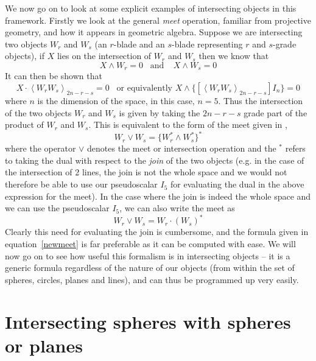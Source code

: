 We now go on to look at some explicit examples of
intersecting objects in this framework. Firstly we look
at the general \emph{meet} operation, familiar from
projective geometry, and how it appears in geometric
algebra. Suppose we are intersecting two objects $W_r$
and $W_s$ (an $r$-blade and an $s$-blade representing $r$
and $s$-grade objects), if $X$ lies on the intersection
of $W_r$ and $W_s$ then we know that
%
\[ X\wedge W_r = 0 \;\;\;\mbox{and}\;\;\;\; X\wedge W_s = 0
\]
%
It can then be shown that
%
\begin{equation}
X\cdot \left< W_r W_s \right>_{2n-r-s} = 0 \;\;\; \mbox{or equivalently }
X\wedge \{\left[\left< W_r W_s \right>_{2n-r-s}\right]I_n\} = 0
\label{newmeet}
\end{equation}
%
where $n$ is the dimension of the space, in this case, $n=5$. Thus
the intersection of the two objects $W_r$ and $W_s$ is given by
taking the $2n-r-s$ grade part of the product of $W_r$ and $W_s$.
This is equivalent to the form of the meet given in
\cite{HZ91,HS84},
%
\begin{equation}
W_r \vee W_s = \{ W_r^* \wedge W_s^*\}^*
\end{equation}
%
where the operator $\vee$ denotes the meet or
intersection operation and the $^*$ refers to taking the
dual with respect to the \emph{join} of the two objects
(e.g. in the case of the intersection of 2 lines, the
join is not the whole space and we would not therefore be
able to use our pseudoscalar $I_5$ for evaluating the
dual in the above expression for the meet). In the case
where the join is indeed the whole space and we can use
the pseudoscalar $I_5$, we can also write the meet as
%
\[W_r \vee W_s = W_r \cdot (W_s)^*  \]
%
Clearly this need for evaluating the join is cumbersome, and the
formula given in equation~\ref{newmeet} is far preferable as it
can be computed with ease. We will now go on to see how useful
this formalism is in intersecting objects -- it is a generic
formula regardless of the nature of our objects (from within the
set of spheres, circles, planes and lines), and can thus be
programmed up very easily.



\section{Intersecting spheres with spheres or planes}

